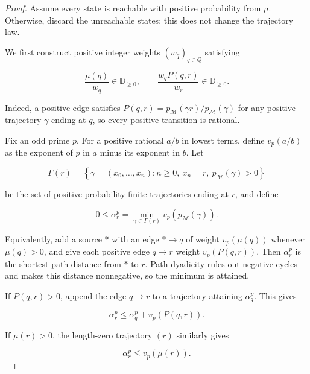 \documentclass[10pt]{article}
\theoremstyle{definition}
\begin{document}
\begin{proof}
Assume every state is reachable with positive probability from $\mu$.
Otherwise, discard the unreachable states; this does not change the
trajectory law.

We first construct positive integer weights $(w_q)_{q\in Q}$ satisfying

\begin{equation}
 \frac{\mu(q)}{w_q}\in\mathbb D_{\ge0},\qquad
 \frac{w_qP(q,r)}{w_r}\in\mathbb D_{\ge0}.
 \label{eq:weightcondition}
\end{equation}

Indeed, a positive edge satisfies
$P(q,r)=p_{\mathcal M}(\gamma r)/p_{\mathcal M}(\gamma)$ for any positive
trajectory $\gamma$ ending at $q$, so every positive transition is rational.

Fix an odd prime $p$.  For a positive rational $a/b$ in lowest terms, define
$v_p(a/b)$ as the exponent of $p$ in $a$ minus its exponent in $b$.  Let

\begin{equation}
 \Gamma(r)
 =
 \left\{
  \gamma=(x_0,\ldots,x_n):
  n\ge0,\ x_n=r,\ p_{\mathcal M}(\gamma)>0
 \right\}
\end{equation}

be the set of positive-probability finite trajectories ending at $r$, and
define

\begin{equation}
 0\le\alpha_r^p
 =
 \min_{\gamma\in\Gamma(r)}
 v_p\!\left(p_{\mathcal M}(\gamma)\right).
\end{equation}

Equivalently, add a source $*$ with an edge $*\to q$ of weight
$v_p(\mu(q))$ whenever $\mu(q)>0$, and give each positive edge $q\to r$
weight $v_p(P(q,r))$.  Then $\alpha_r^p$ is the shortest-path distance from
$*$ to $r$.  Path-dyadicity rules out negative cycles and makes this distance
nonnegative, so the minimum is attained.

If $P(q,r)>0$, append the edge $q\to r$ to a trajectory attaining
$\alpha_q^p$.  This gives

\begin{equation}
 \alpha_r^p\le\alpha_q^p+v_p(P(q,r)).
\end{equation}

If $\mu(r)>0$, the length-zero trajectory $(r)$ similarly gives

\begin{equation}
 \alpha_r^p\le v_p(\mu(r)).
\end{equation}


\end{proof}
\end{document}
